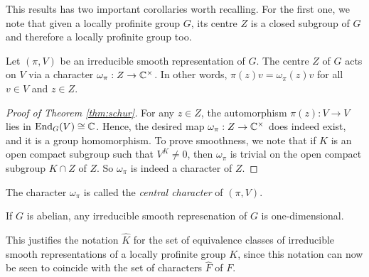This results has two important corollaries worth recalling. For the first one, we note that given a locally profinite group $G$, its centre $Z$ is a closed subgroup of $G$ and therefore a locally profinite group too.

\begin{cor}\label{cor:centralchar}
    Let $(\pi,V)$ be an irreducible smooth representation of $G$. The centre $Z$ of $G$ acts on $V$ via a character $\omega_{\pi}:Z\to\mathbb{C}^{\times}$. In other words, $\pi(z)v=\omega_{\pi}(z)v$ for all $v\in V$ and $z\in Z$.
\end{cor}

\begin{proof}[Proof of Theorem \ref{thm:schur}]
    For any $z\in Z$, the automorphism $\pi(z):V\to V$ lies in $\mathrm{End}_G(V)\cong\mathbb{C}$. Hence, the desired map $\omega_{\pi}:Z\to\mathbb{C}^{\times}$ does indeed exist, and it is a group homomorphism. To prove smoothness, we note that if $K$ is an open compact subgroup such that $V^K\neq 0$, then $\omega_{\pi}$ is trivial on the open compact subgroup $K\cap Z$ of $Z$. So $\omega_{\pi}$ is indeed a character of $Z$.
\end{proof}

The character $\omega_{\pi}$ is called the \textit{central character} of $(\pi,V)$.

\begin{cor}
    If $G$ is abelian, any irreducible smooth represenation of $G$ is one-dimensional.
\end{cor}

This justifies the notation $\hat{K}$ for the set of equivalence classes of irreducible smooth representations of a locally profinite group $K$, since this notation can now be seen to coincide with the set of characters $\hat{F}$ of $F$.